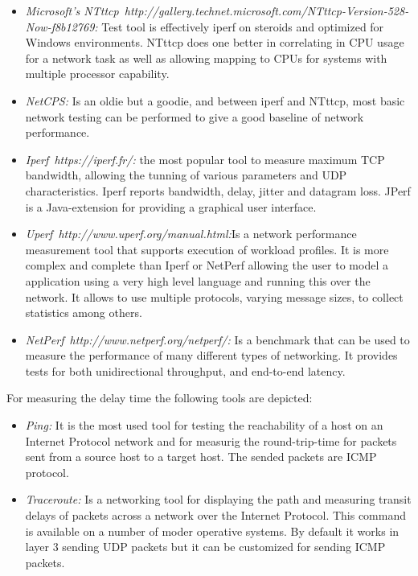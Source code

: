 \begin{itemize}
\item \emph{Microsoft's NTttcp~{http://gallery.technet.microsoft.com/NTttcp-Version-528-Now-f8b12769}:} Test tool is effectively iperf on steroids and
  optimized for Windows environments. NTttcp does one better in correlating in
  CPU usage for a network task as well as allowing mapping to CPUs for systems
  with multiple processor capability. 
\item \emph{NetCPS:} Is an oldie but a goodie, and between iperf and NTttcp,
  most basic network testing can be performed to give a good baseline of network
  performance.
\item \emph{Iperf~{https://iperf.fr/}:} the most popular tool to measure maximum TCP bandwidth, allowing the
  tunning of various parameters and UDP characteristics. Iperf reports
  bandwidth, delay, jitter and datagram loss. JPerf is a Java-extension for
  providing a graphical user interface.
\item \emph{Uperf~{http://www.uperf.org/manual.html}:}Is a network
  performance measurement tool that supports execution of workload profiles. It
  is more complex and complete than Iperf or NetPerf allowing the user to model
  a application using a very high level language and running this over the
  network. It allows to use multiple protocols, varying message sizes, to
  collect statistics among others.
\item \emph{NetPerf~{http://www.netperf.org/netperf/}:} Is a benchmark that can be used to measure the performance of many different types of networking. It provides tests for both unidirectional throughput, and end-to-end latency.
\end{itemize}

For measuring the delay time the following tools are depicted:
\begin{itemize}
\item \emph{Ping:} It is the most used tool for testing the reachability of a host on an
  Internet Protocol network and for measurig the round-trip-time for packets sent
  from a source host to a target host. The sended packets are \ac{ICMP} protocol.
\item \emph{Traceroute:} Is a networking tool for displaying the path and
  measuring transit delays of packets across a network over the Internet
  Protocol. This command is available on a number of moder operative systems. By
  default it works in layer 3 sending \ac{UDP} packets but it can be customized
  for sending \ac{ICMP} packets.
\end{itemize}

